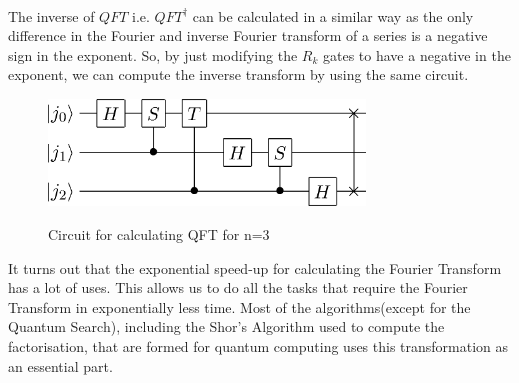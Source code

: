 \\The inverse of $QFT$ i.e. $QFT^{\dagger}$ can be calculated in a similar way as the only difference in the Fourier and inverse Fourier transform of a series is a negative sign in the exponent. So, by just modifying the $R_k$ gates to have a negative in the exponent, we can compute the inverse transform by using the same circuit.
\begin{figure}[t]
\centering
\includegraphics[width=0.75\textwidth]{images/qft3.png}
\label{qft3}
\caption{Circuit for calculating QFT for n=3}
\end{figure}
\newline It turns out that the exponential speed-up for calculating the Fourier Transform has a lot of uses. This allows us to do all the tasks that require the Fourier Transform in exponentially less time.  Most of the algorithms(except for the Quantum Search), including the Shor's Algorithm used to compute the factorisation, that are formed for quantum computing uses this transformation as an essential part.\\

